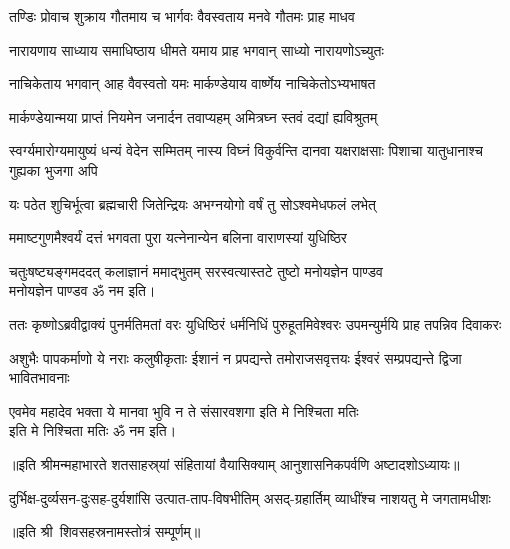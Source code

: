 \twolineshloka
{तण्डिः प्रोवाच शुक्राय गौतमाय च भार्गवः}%
{वैवस्वताय मनवे गौतमः प्राह माधव}%

\twolineshloka
{नारायणाय साध्याय समाधिष्ठाय धीमते}%
{यमाय प्राह भगवान् साध्यो नारायणोऽच्युतः}%

\twolineshloka
{नाचिकेताय भगवान् आह वैवस्वतो यमः}%
{मार्कण्डेयाय वार्ष्णेय नाचिकेतोऽभ्यभाषत}%

\twolineshloka
{मार्कण्डेयान्मया प्राप्तं नियमेन जनार्दन}%
{तवाप्यहम् अमित्रघ्न स्तवं दद्यां ह्यविश्रुतम्}%



\threelineshloka
{स्वर्ग्यमारोग्यमायुष्यं धन्यं वेदेन सम्मितम्}
{नास्य विघ्नं विकुर्वन्ति दानवा यक्षराक्षसाः}%
{पिशाचा यातुधानाश्च गुह्यका भुजगा अपि}%

\twolineshloka
{यः पठेत शुचिर्भूत्वा ब्रह्मचारी जितेन्द्रियः}%
{अभग्नयोगो वर्षं तु सोऽश्वमेधफलं लभेत्}%

\twolineshloka
{ममाष्टगुणमैश्वर्यं दत्तं भगवता पुरा}%
{यत्नेनान्येन बलिना वाराणस्यां युधिष्ठिर}%


\twolineshloka
{चतुःषष्ट्यङ्गमददत् कलाज्ञानं ममाद्भुतम्}%
{सरस्वत्यास्तटे तुष्टो मनोयज्ञेन पाण्डव}\mbox{}\\[-1.6em]%
मनोयज्ञेन पाण्डव ॐ नम इति।

\threelineshloka
{ततः कृष्णोऽब्रवीद्वाक्यं पुनर्मतिमतां वरः}
{युधिष्ठिरं धर्मनिधिं पुरुहूतमिवेश्वरः}%
{उपमन्युर्मयि प्राह तपन्निव दिवाकरः}%

\threelineshloka
{अशुभैः पापकर्माणो ये नराः कलुषीकृताः}
{ईशानं न प्रपद्यन्ते तमोराजसवृत्तयः}%
{ईश्वरं सम्प्रपद्यन्ते द्विजा भावितभावनाः}%


\twolineshloka
{एवमेव महादेव भक्ता ये मानवा भुवि}%
{न ते संसारवशगा इति मे निश्चिता मतिः}\mbox{}\\[-1.6em]%
इति मे निश्चिता मतिः ॐ नम इति।

॥इति श्रीमन्महाभारते शतसाहस्र्यां संहितायां वैयासिक्याम् आनुशासनिकपर्वणि अष्टादशोऽध्यायः॥

{दुर्भिक्ष-दुर्व्यसन-दुःसह-दुर्यशांसि}
{उत्पात-ताप-विषभीतिम् असद्‌-ग्रहार्तिम्}
{व्याधींश्च नाशयतु मे जगतामधीशः}

॥इति श्री~शिवसहस्रनामस्तोत्रं सम्पूर्णम्॥